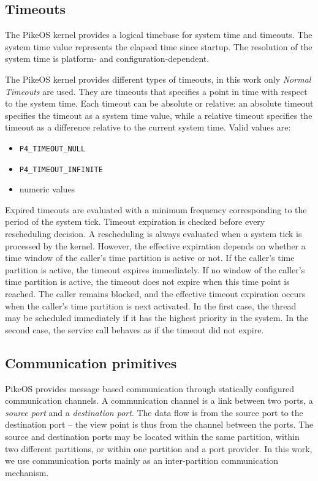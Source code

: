 \subsection{Timeouts}
The PikeOS kernel provides a logical timebase for system time and timeouts. The system time value represents the elapsed time since startup. The resolution of the system time is platform- and configuration-dependent.

\par The PikeOS kernel provides different types of timeouts, in this work only \emph{Normal Timeouts} are used. They are timeouts that specifies a point in time with respect to the system time. Each timeout can be absolute or relative: an absolute timeout specifies the timeout as a system time value, while a relative timeout specifies the timeout as a difference relative to the current system time. Valid values are:
\begin{itemize}
\item \verb|P4_TIMEOUT_NULL|
\item \verb|P4_TIMEOUT_INFINITE|
\item numeric values
\end{itemize}

Expired timeouts are evaluated with a minimum frequency corresponding to the period of the system tick. Timeout expiration is checked before every rescheduling decision. A rescheduling is always evaluated when a system tick is processed by the kernel. However, the effective expiration depends on whether a time window of the caller's time partition is active or not. If the caller’s time partition is active, the timeout expires immediately. If no window of the caller’s time partition is active, the timeout does not expire when this time point is reached. The caller remains blocked, and the effective timeout expiration occurs when the caller’s time partition is next activated. In the first case, the thread may be scheduled immediately if it has the highest priority in the system. In the second case, the service call behaves as if the timeout did not expire.

\subsection{Communication primitives}\label{sec:CommPorts}
PikeOS provides message based communication through statically configured communication channels. A communication channel is a link between two ports, a \emph{source port} and a \emph{destination port}. The data flow is from the source port to the destination port – the view point is thus from the channel between the ports. The source and destination ports may be located within the same partition, within two different partitions, or within one partition and a port provider. In this work, we use communication ports mainly as an inter-partition communication mechanism. 

